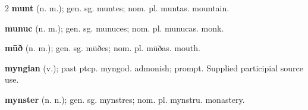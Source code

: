 \begin{multicols*}{2}
\textbf{munt} (n. m.); gen. sg. muntes; nom. pl. muntas. mountain.\par
\textbf{munuc} (n. m.); gen. sg. munuces; nom. pl. munucas. monk.\par
\textbf{mūð} (n. m.); gen. sg. mūðes; nom. pl. mūðas. mouth.\par
\textbf{myngian} (v.); past ptcp. myngod. admonish; prompt. Supplied participial source use.\par
\textbf{mynster} (n. n.); gen. sg. mynstres; nom. pl. mynstru. monastery.\par

\end{multicols*}
